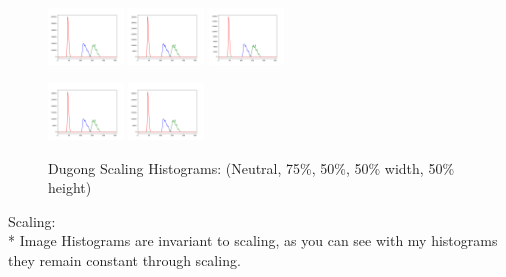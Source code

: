 \documentclass[conference]{IEEEtran}
\begin{document}
\begin{figure}[H]
    \centerline{
        {\includegraphics[width=20mm, scale=0.5]{./figures/ScalingHists/dugong.png}}
        {\includegraphics[width=20mm, scale=0.5]{./figures/ScalingHists/dugong75.png}}
        {\includegraphics[width=20mm, scale=0.5]{./figures/ScalingHists/dugong50.png}}
    }
    \centerline{
        {\includegraphics[width=20mm, scale=0.5]{./figures/ScalingHists/dugong50w.png}}
        {\includegraphics[width=20mm, scale=0.5]{./figures/ScalingHists/dugong50h.png}}
    }
    \caption{Dugong Scaling Histograms: (Neutral, 75\%, 50\%, 50\% width, 50\% height)}
    \label{fig}
\end{figure}
Scaling: \\*
Image Histograms are invariant to scaling, as you can see with my histograms they remain constant through scaling.
\end{document}
